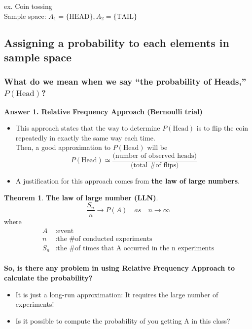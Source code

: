 \documentclass[twoside]{article}
\theoremstyle{definition}
\newtheorem{theorem}[definition]{Theorem}
\theoremstyle{remark}
\begin{document}
ex. Coin tossing
\\ Sample space: $A_1 = \{\mathrm{HEAD}\}, A_2 = \{\mathrm{TAIL}\}$

\clearpage

\subsection{Assigning a probability to each elements in sample space}

\subsubsection{What do we mean when we say ``the probability of Heads,'' $P(\textrm{Head})$?}

\textbf{Answer 1. Relative Frequency Approach (Bernoulli trial)}
\begin{itemize}
  \item This approach states that the way to determine $P(\textrm{Head})$ is
  to flip the coin repeatedly in exactly the same way each time. \\
  Then, a good approximation to $P(\textrm{Head})$ will be
  $$P(\textrm{Head}) \simeq
  \frac{\textrm{(number of observed heads)}}{\textrm{(total \# of flips)}}$$

  \item A justification for this approach comes from \textbf{the law of large numbers}.
\end{itemize}

\begin{theorem}
  \textbf{The law of large number (LLN)}.\\
  \begin{equation}
    \frac{S_n}{n} \rightarrow P(A) \quad as \quad n \rightarrow \infty
  \end{equation}
  where
  \begin{equation}
    \begin{split}
      A   &: \textrm{event} \\
      n   &: \textrm{the \# of conducted experiments} \\
      S_n &: \textrm{the \# of times that A occurred in the n experiments} \\
    \end{split}
  \end{equation}
\end{theorem}

\textbf{So, is there any problem in using Relative Frequency Approach to calculate the probability?} \\
\begin{itemize}
  \item It is just a \textrm{long-run} approximation: It requires the large number
        of experiments!
  \item Is it possible to compute the probability of you getting A in this class?
\end{itemize}
\end{document}
